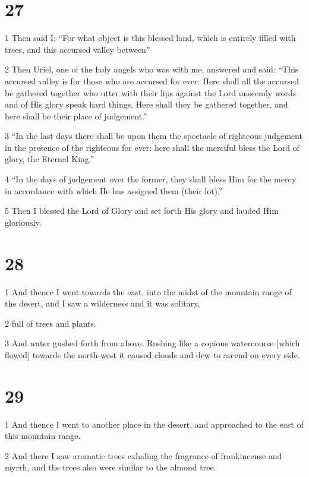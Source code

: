 \chapter{27}

\par 1 Then said I: “For what object is this blessed land, which is entirely filled with trees, and this accursed valley between”
\par 2 Then Uriel, one of the holy angels who was with me, answered and said: “This accursed valley is for those who are accursed for ever: Here shall all the accursed be gathered together who utter with their lips against the Lord unseemly words and of His glory speak hard things. Here shall they be gathered together, and here shall be their place of judgement.”
\par 3 “In the last days there shall be upon them the spectacle of righteous judgement in the presence of the righteous for ever: here shall the merciful bless the Lord of glory, the Eternal King.”
\par 4 “In the days of judgement over the former, they shall bless Him for the mercy in accordance with which He has assigned them (their lot).”
\par 5 Then I blessed the Lord of Glory and set forth His glory and lauded Him gloriously.

\chapter{28}

\par 1 And thence I went towards the east, into the midst of the mountain range of the desert, and I saw a wilderness and it was solitary,
\par 2 full of trees and plants.
\par 3 And water gushed forth from above. Rushing like a copious watercourse [which flowed] towards the north-west it caused clouds and dew to ascend on every side.

\chapter{29}

\par 1 And thence I went to another place in the desert, and approached to the east of this mountain range.
\par 2 And there I saw aromatic trees exhaling the fragrance of frankincense and myrrh, and the trees also were similar to the almond tree.

